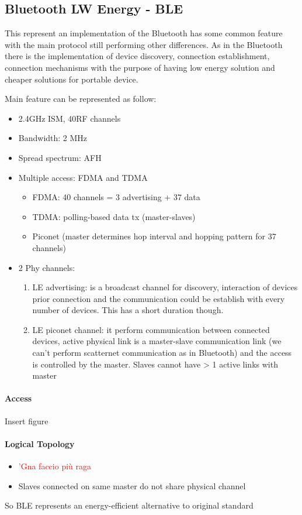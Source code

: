 \subsection{Bluetooth LW Energy - BLE}
This represent an implementation of the Bluetooth has some common feature with the main protocol still performing other differences. As in the Bluetooth there is the implementation of device discovery, connection establishment, connection mechanisms with the purpose of having low energy solution and cheaper solutions for portable device.

Main feature can be represented as follow:
\begin{itemize}
\item 2.4GHz ISM, 40RF channels
\item Bandwidth: 2 MHz
\item Spread spectrum: AFH
\item Multiple access: FDMA and TDMA
\begin{itemize}
\item FDMA: 40 channels = 3 advertising + 37 data
\item TDMA: polling-based data tx (master-slaves)
\item Piconet (master determines hop interval and hopping pattern for 37 channels)
\end{itemize}
\item 2 Phy channels:
\begin{enumerate}
\item LE advertising: is a broadcast channel for discovery, interaction of devices prior connection and the communication could be establish with every number of devices. This has a short duration though.
\item LE piconet channel: it perform communication between connected devices, active physical link is a master-slave communication link (we can't perform scatternet communication as in Bluetooth) and the access is controlled by the master. Slaves cannot have > 1 active links with master
\end{enumerate}
\end{itemize}
\paragraph{Access}
Insert figure
\paragraph{Logical Topology}
\begin{itemize}
\item \textcolor{red}{'Gna faccio più raga}
\item Slaves connected on same master do not share physical channel
\end{itemize}
So BLE represents an energy-efficient alternative to original standard

